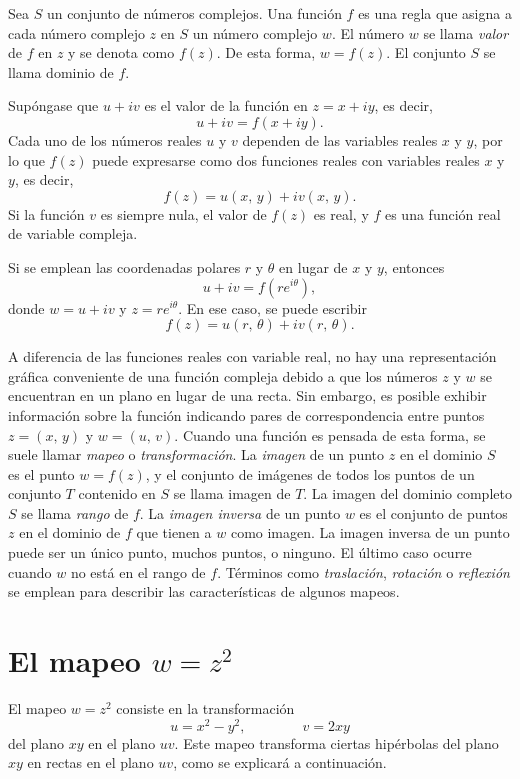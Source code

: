 \documentclass[a4paper]{report}
\begin{document}
Sea \(S\) un conjunto de números complejos. Una función \(f\) es una regla que asigna a cada número complejo \(z\) en \(S\) un número complejo \(w\). El número \(w\) se llama \emph{valor} de \(f\) en \(z\) y se denota como \(f(z)\). De esta forma, \(w=f(z)\). El conjunto \(S\) se llama dominio de \(f\).

Supóngase que \(u+iv\) es el valor de la función en \(z=x+iy\), es decir,
\[
 u+iv=f(x+iy).
\]
Cada uno de los números reales \(u\) y \(v\) dependen de las variables reales \(x\) y \(y\), por lo que \(f(z)\) puede expresarse como dos funciones reales con variables reales \(x\) y \(y\), es decir,
\[
 f(z)=u(x,\,y)+iv(x,\,y).
\]
Si la función \(v\) es siempre nula, el valor de \(f(z)\) es real, y \(f\) es una función real de variable compleja.

Si se emplean las coordenadas polares \(r\) y \(\theta\) en lugar de \(x\) y \(y\), entonces
\[
 u+iv=f(re^{i\theta}),
\]
donde \(w=u+iv\) y \(z=re^{i\theta}\). En ese caso, se puede escribir
\[
 f(z)=u(r,\,\theta)+iv(r,\,\theta).
\]

A diferencia de las funciones reales con variable real, no hay una representación gráfica conveniente de una función compleja debido a que los números \(z\) y \(w\) se encuentran en un plano en lugar de una recta. Sin embargo, es posible exhibir información sobre la función indicando pares de correspondencia entre puntos \(z=(x,\,y)\) y \(w=(u,\,v)\). Cuando una función es pensada de esta forma, se suele llamar \emph{mapeo} o \emph{transformación}. La \emph{imagen} de un punto \(z\) en el dominio \(S\) es el punto \(w=f(z)\), y el conjunto de imágenes de todos los puntos de un conjunto \(T\) contenido en \(S\) se llama imagen de \(T\). La imagen del dominio completo \(S\) se llama \emph{rango} de \(f\). La \emph{imagen inversa} de un punto \(w\) es el conjunto de puntos \(z\) en el dominio de \(f\) que tienen a \(w\) como imagen. La imagen inversa de un punto puede ser un único punto, muchos puntos, o ninguno. El último caso ocurre cuando \(w\) no está en el rango de \(f\). Términos como \emph{traslación}, \emph{rotación} o \emph{reflexión} se emplean para describir las características de algunos mapeos.

\section{El mapeo \texorpdfstring{\(w=z^2\)}{}}\label{sec:square_mapping}

El mapeo \(w=z^2\) consiste en la transformación
\begin{equation}\label{eq:square_mapping}
  u=x^2-y^2,\qquad\qquad v=2xy
\end{equation}
del plano \(xy\) en el plano \(uv\). Este mapeo transforma ciertas hipérbolas del plano \(xy\) en rectas en el plano \(uv\), como se explicará a continuación.
\end{document}
